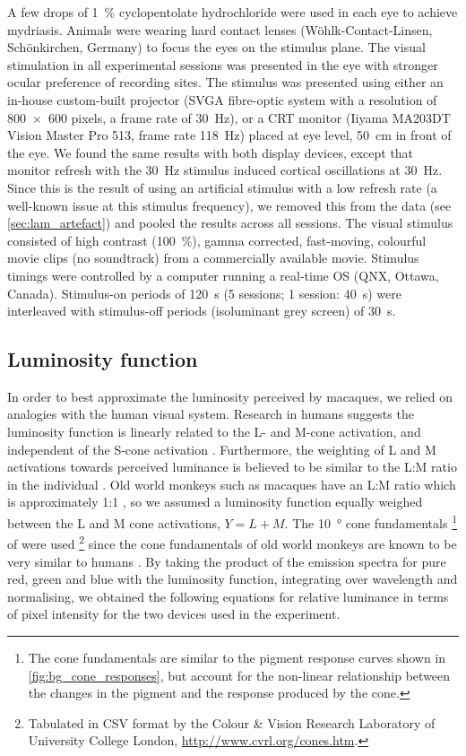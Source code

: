 A few drops of \SI{1}{\percent} cyclopentolate hydrochloride were used in each eye to achieve mydriasis.
Animals were wearing hard contact lenses (W\"ohlk-Contact-Linsen, Sch\"onkirchen, Germany) to focus the eyes on the stimulus plane.
The visual stimulation in all experimental sessions was presented in the eye with stronger ocular preference of recording sites.
The stimulus was presented using either an in-house custom-built projector (SVGA fibre-optic system with a resolution of \num{800x600} pixels, a frame rate of \SI{30}{Hz}), or a \ac{CRT} monitor (Iiyama MA203DT Vision Master Pro 513, frame rate \SI{118}{Hz}) placed at eye level, \SI{50}{\centi\metre} in front of the eye.
We found the same results with both display devices, except that monitor refresh with the \SI{30}{Hz} stimulus induced cortical oscillations at \SI{30}{Hz}.
Since this is the result of using an artificial stimulus with a low refresh rate (a well-known issue at this stimulus frequency), we removed this from the data (see \autoref{sec:lam_artefact}) and pooled the results across all sessions.
The visual stimulus consisted of high contrast (\SI{100}{\percent}), gamma corrected, fast-moving, colourful movie clips (no soundtrack) from a commercially available movie.
Stimulus timings were controlled by a computer running a real-time OS (QNX, Ottawa, Canada).
Stimulus-on periods of \SI{120}{\second} (\num{5} sessions; \num{1} session: \SI{40}{\second}) were interleaved with stimulus-off periods (isoluminant grey screen) of \SI{30}{\second}.


\subsection{Luminosity function}
\label{sec:lam_lumos}

In order to best approximate the luminosity perceived by macaques, we relied on analogies with the human visual system.
Research in humans suggests the luminosity function is linearly related to the L- and M-cone activation, and independent of the S-cone activation \citep{Stockman2008}.
Furthermore, the weighting of L and M activations towards perceived luminance is believed to be similar to the L:M ratio in the individual \citep{Stockman2008}.
Old world monkeys such as macaques have an L:M ratio which is approximately 1:1 \citep{Dobkins2000}, so we assumed a luminosity function equally weighed between the L and M cone activations, $Y=L+M$.
The \SI{10}{\degree} cone fundamentals%
\footnote{The cone fundamentals are similar to the pigment response curves shown in \autoref{fig:bg_cone_responses}, but account for the non-linear relationship between the changes in the pigment and the response produced by the cone.}
of \citet{Stockman2000} were used%
\footnote{Tabulated in CSV format by the Colour \& Vision Research Laboratory of University College London, \url{http://www.cvrl.org/cones.htm}.}
since the cone fundamentals of old world monkeys are known to be very similar to humans \citep{Dobkins2000}.
By taking the product of the emission spectra for pure red, green and blue with the luminosity function, integrating over wavelength and normalising, we obtained the following equations for relative luminance in terms of pixel intensity for the two devices used in the experiment.

